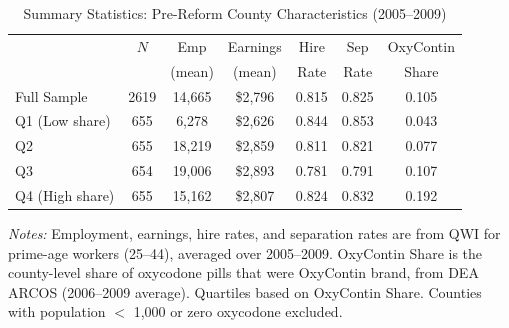 \begin{table}[t]
\centering
\caption{Summary Statistics: Pre-Reform County Characteristics (2005--2009)}
\label{tab:sumstats}
\begin{threeparttable}
\begin{tabular}{lcccccc}
\toprule
 & $N$ & Emp & Earnings & Hire & Sep & OxyContin \\
 & & (mean) & (mean) & Rate & Rate & Share \\
\midrule
Full Sample & 2619 & 14,665 & \$2,796 & 0.815 & 0.825 & 0.105 \\
\midrule
Q1 (Low share) & 655 & 6,278 & \$2,626 & 0.844 & 0.853 & 0.043 \\
Q2 & 655 & 18,219 & \$2,859 & 0.811 & 0.821 & 0.077 \\
Q3 & 654 & 19,006 & \$2,893 & 0.781 & 0.791 & 0.107 \\
Q4 (High share) & 655 & 15,162 & \$2,807 & 0.824 & 0.832 & 0.192 \\
\bottomrule
\end{tabular}
\begin{tablenotes}[flushleft]
\footnotesize
\item \textit{Notes:} Employment, earnings, hire rates, and separation rates are from QWI for prime-age workers (25--44), averaged over 2005--2009. OxyContin Share is the county-level share of oxycodone pills that were OxyContin brand, from DEA ARCOS (2006--2009 average). Quartiles based on OxyContin Share. Counties with population $<$ 1,000 or zero oxycodone excluded.
\end{tablenotes}
\end{threeparttable}
\end{table}

